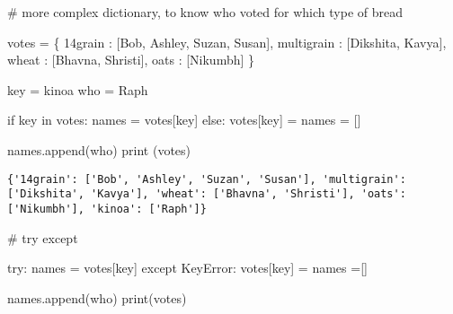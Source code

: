 \documentclass[
]{report}
\newenvironment{Shaded}{\begin{snugshade}}{\end{snugshade}}
\newcommand{\BuiltInTok}[1]{\textcolor[rgb]{0.00,0.23,0.31}{#1}}
\newcommand{\CommentTok}[1]{\textcolor[rgb]{0.37,0.37,0.37}{#1}}
\newcommand{\ControlFlowTok}[1]{\textcolor[rgb]{0.00,0.23,0.31}{#1}}
\newcommand{\KeywordTok}[1]{\textcolor[rgb]{0.00,0.23,0.31}{#1}}
\newcommand{\NormalTok}[1]{\textcolor[rgb]{0.00,0.23,0.31}{#1}}
\newcommand{\OperatorTok}[1]{\textcolor[rgb]{0.37,0.37,0.37}{#1}}
\newcommand{\PreprocessorTok}[1]{\textcolor[rgb]{0.68,0.00,0.00}{#1}}
\newcommand{\StringTok}[1]{\textcolor[rgb]{0.13,0.47,0.30}{#1}}
\begin{document}
\begin{Shaded}
\begin{Highlighting}[]
\CommentTok{\# more complex dictionary, to know who voted for which type of bread}

\NormalTok{votes }\OperatorTok{=}\NormalTok{ \{}
    \StringTok{\textquotesingle{}14grain\textquotesingle{}}\NormalTok{ : [}\StringTok{\textquotesingle{}Bob\textquotesingle{}}\NormalTok{, }\StringTok{\textquotesingle{}Ashley\textquotesingle{}}\NormalTok{, }\StringTok{\textquotesingle{}Suzan\textquotesingle{}}\NormalTok{, }\StringTok{\textquotesingle{}Susan\textquotesingle{}}\NormalTok{],}
    \StringTok{\textquotesingle{}multigrain\textquotesingle{}}\NormalTok{ : [}\StringTok{\textquotesingle{}Dikshita\textquotesingle{}}\NormalTok{, }\StringTok{\textquotesingle{}Kavya\textquotesingle{}}\NormalTok{],}
    \StringTok{\textquotesingle{}wheat\textquotesingle{}}\NormalTok{ : [}\StringTok{\textquotesingle{}Bhavna\textquotesingle{}}\NormalTok{, }\StringTok{\textquotesingle{}Shristi\textquotesingle{}}\NormalTok{],}
    \StringTok{\textquotesingle{}oats\textquotesingle{}}\NormalTok{ : [}\StringTok{\textquotesingle{}Nikumbh\textquotesingle{}}\NormalTok{]}
\NormalTok{\}}

\NormalTok{key }\OperatorTok{=} \StringTok{\textquotesingle{}kinoa\textquotesingle{}} 
\NormalTok{who }\OperatorTok{=} \StringTok{\textquotesingle{}Raph\textquotesingle{}}

\ControlFlowTok{if}\NormalTok{ key }\KeywordTok{in}\NormalTok{ votes: }
\NormalTok{    names }\OperatorTok{=}\NormalTok{ votes[key]}
\ControlFlowTok{else}\NormalTok{:}
\NormalTok{    votes[key] }\OperatorTok{=}\NormalTok{ names }\OperatorTok{=}\NormalTok{ []}
    
\NormalTok{names.append(who)}
\BuiltInTok{print}\NormalTok{ (votes)}
\end{Highlighting}
\end{Shaded}

\begin{verbatim}
{'14grain': ['Bob', 'Ashley', 'Suzan', 'Susan'], 'multigrain': ['Dikshita', 'Kavya'], 'wheat': ['Bhavna', 'Shristi'], 'oats': ['Nikumbh'], 'kinoa': ['Raph']}
\end{verbatim}

\begin{Shaded}
\begin{Highlighting}[]
\CommentTok{\# try except}

\ControlFlowTok{try}\NormalTok{:}
\NormalTok{    names }\OperatorTok{=}\NormalTok{ votes[key]}
\ControlFlowTok{except} \PreprocessorTok{KeyError}\NormalTok{:}
\NormalTok{    votes[key] }\OperatorTok{=}\NormalTok{ names }\OperatorTok{=}\NormalTok{[]}

\NormalTok{names.append(who)}
\BuiltInTok{print}\NormalTok{(votes)}
\end{Highlighting}
\end{Shaded}
\end{document}
